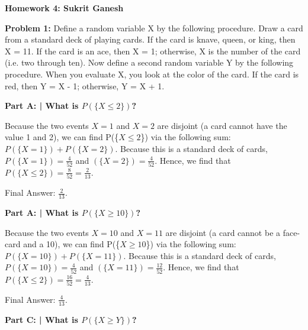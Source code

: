 \documentclass{article}
\begin{document}
 
 \begin{center}
     \Huge\textbf{Homework 4: Sukrit Ganesh}\par
 \end{center}
 
  \noindent\makebox[\linewidth]{\rule{\paperwidth}{0.4pt}}\newline
 
 \begin{center}
      \Large\textbf{Problem 1:} Define a random variable X by the following procedure. Draw a card from a standard deck of playing cards. If the card is knave, queen, or king, then X = 11. If the card is an ace, then X = 1; otherwise, X is the number of the card (i.e. two through ten). Now define a second random variable Y by the following procedure. When you evaluate X, you look at the color of the card. If the card is red, then Y = X - 1; otherwise, Y = X + 1. \par
 \end{center}
 
 \textbf{Part A: | What is $P(\{X \leq 2\})$?}\newline
 
 Because the two events $X=1$ and $X=2$ are disjoint (a card cannot have the value 1 and 2), we can find P(\{$X \leq 2$\}) via the following sum: $P(\{X = 1\}) + P(\{X = 2\})$. Because this is a standard deck of cards, $P(\{X = 1\}) = \frac{4}{52}$ and $(\{X = 2\}) = \frac{4}{52}$. Hence, we find that $P(\{X \leq 2\}) = \frac{8}{52} = \frac{2}{13}$.\newline
 
 Final Answer: $\frac{2}{13}$.\newline
 
 \textbf{Part A: | What is $P(\{X \geq 10\})$?}\newline
 
 Because the two events $X=10$ and $X=11$ are disjoint (a card cannot be a face-card and a 10), we can find P(\{$X \geq 10$\}) via the following sum: $P(\{X = 10\}) + P(\{X = 11\})$. Because this is a standard deck of cards, $P(\{X = 10\}) = \frac{4}{52}$ and $(\{X = 11\}) = \frac{12}{52}$. Hence, we find that $P(\{X \leq 2\}) = \frac{16}{52} = \frac{4}{13}$.\newline
 
 Final Answer: $\frac{4}{13}$.\newline
 
 \textbf{Part C: | What is $P(\{X \geq Y\})$?}\newline
 
\end{document}
